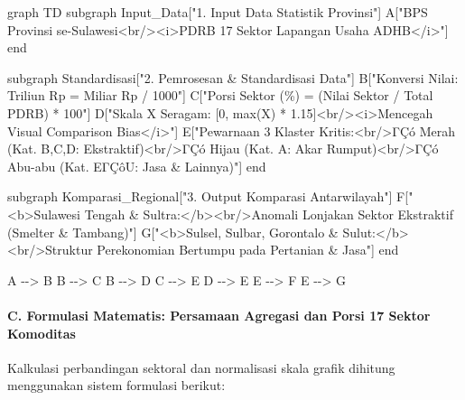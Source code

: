 \documentclass[
]{article}
\newenvironment{Shaded}{}{}
\newcommand{\NormalTok}[1]{#1}
\begin{document}
\begin{Shaded}
\begin{Highlighting}[]
\NormalTok{graph TD}
\NormalTok{    subgraph Input\_Data["1. Input Data Statistik Provinsi"]}
\NormalTok{        A["BPS Provinsi se{-}Sulawesi\textless{}br/\textgreater{}\textless{}i\textgreater{}PDRB 17 Sektor Lapangan Usaha ADHB\textless{}/i\textgreater{}"]}
\NormalTok{    end}

\NormalTok{    subgraph Standardisasi["2. Pemrosesan \& Standardisasi Data"]}
\NormalTok{        B["Konversi Nilai: Triliun Rp = Miliar Rp / 1000"]}
\NormalTok{        C["Porsi Sektor (\%) = (Nilai Sektor / Total PDRB) * 100"]}
\NormalTok{        D["Skala X Seragam: [0, max(X) * 1.15]\textless{}br/\textgreater{}\textless{}i\textgreater{}Mencegah Visual Comparison Bias\textless{}/i\textgreater{}"]}
\NormalTok{        E["Pewarnaan 3 Klaster Kritis:\textless{}br/\textgreater{}ΓÇó Merah (Kat. B,C,D: Ekstraktif)\textless{}br/\textgreater{}ΓÇó Hijau (Kat. A: Akar Rumput)\textless{}br/\textgreater{}ΓÇó Abu{-}abu (Kat. EΓÇôU: Jasa \& Lainnya)"]}
\NormalTok{    end}

\NormalTok{    subgraph Komparasi\_Regional["3. Output Komparasi Antarwilayah"]}
\NormalTok{        F["\textless{}b\textgreater{}Sulawesi Tengah \& Sultra:\textless{}/b\textgreater{}\textless{}br/\textgreater{}Anomali Lonjakan Sektor Ekstraktif (Smelter \& Tambang)"]}
\NormalTok{        G["\textless{}b\textgreater{}Sulsel, Sulbar, Gorontalo \& Sulut:\textless{}/b\textgreater{}\textless{}br/\textgreater{}Struktur Perekonomian Bertumpu pada Pertanian \& Jasa"]}
\NormalTok{    end}

\NormalTok{    A {-}{-}\textgreater{} B}
\NormalTok{    B {-}{-}\textgreater{} C}
\NormalTok{    B {-}{-}\textgreater{} D}
\NormalTok{    C {-}{-}\textgreater{} E}
\NormalTok{    D {-}{-}\textgreater{} E}
\NormalTok{    E {-}{-}\textgreater{} F}
\NormalTok{    E {-}{-}\textgreater{} G}
\end{Highlighting}
\end{Shaded}

\paragraph{C. Formulasi Matematis: Persamaan Agregasi dan Porsi 17
Sektor
Komoditas}\label{c.-formulasi-matematis-persamaan-agregasi-dan-porsi-17-sektor-komoditas}

Kalkulasi perbandingan sektoral dan normalisasi skala grafik dihitung
menggunakan sistem formulasi berikut:
\end{document}
